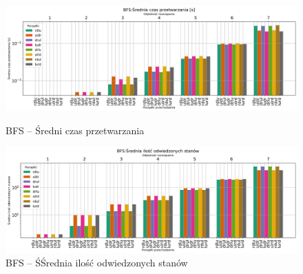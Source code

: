 \documentclass{classrep}
\begin{document}
\begin{figure}[H]
    \includegraphics[width=\textwidth]{charts/BFS_time.png}
    \caption{BFS -- Średni czas przetwarzania}
    \label{BFS:time}
    \includegraphics[width=\textwidth]{charts/BFS_visited.png}
    \caption{BFS -- ŚŚrednia ilość odwiedzonych stanów}
    \label{BFS:visited}
\end{figure}
\end{document}
